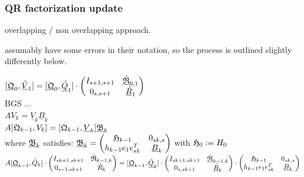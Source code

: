 \documentclass{scrartcl}
\begin{document}
\subsubsection{QR factorization update}
overlapping / non overlapping approach.

\cite{Hoemmen:2010:CKS:1970638} assumably have some errors in their notation, so the process is outlined slightly differently below.

$[\underline{\frak{Q}}_0, \underline{\acute{V}}_1 ] = [\underline{\frak{Q}}_0, \underline{\acute{Q}}_1 ] \cdot 
\begin{pmatrix}
	I_{s + 1, s + 1} & \underline{\acute{\frak{R}}}_{0,1} \\
	0_{s,s + 1} & \underline{\acute{R}}_1 \\
\end{pmatrix}$ \\

BGS $\ldots$\\

$AV_k = \underline{V}_k\underline{B}_k$ \\

$A [\frak{Q}_{k - 1}, V_k] = [\frak{Q}_{k - 1}, \underline{V}_k]\underline{\frak{B}}_k$ \\

where $\underline{\frak{B}}_k$ satisfies:
$\underline{\frak{B}}_k = 
\begin{pmatrix}
	\frak{H}_{k - 1} & 0_{sk, s} \\
	h_{k - 1} e_1 e^T_{sk} & \underline{B}_k \\
\end{pmatrix}$ with $\frak{H}_0 := H_0$ \\

$A [\underline{\frak{Q}}_{k - 1}, \acute{Q}_k] \cdot 
\begin{pmatrix}
	I_{sk + 1, sk + 1} & \acute{\frak{R}}_{k - 1, k} \\
	0_{s - 1, sk + 1} &\acute{R}_k \\
\end{pmatrix}
 = [ \underline{\frak{Q}}_{k - 1}, \underline{\acute{Q}}_k ] \cdot 
\begin{pmatrix}
	I_{sk + 1, sk + 1} & \underline{\acute{\frak{R}}}_{k - 1, k} \\
	0_{s, sk + 1} & \underline{\acute{R}}_k \\
\end{pmatrix} \cdot
\begin{pmatrix}
	\frak{H}_{k - 1} & 0_{sk, s} \\
	h_{k - 1} e_1 e^T_{sk} & \underline{B}_k \\
\end{pmatrix}
$ \\
\end{document}

